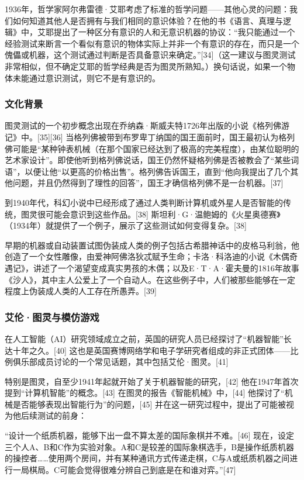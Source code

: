 1936年，哲学家阿尔弗雷德·艾耶考虑了标准的哲学问题——其他心灵的问题：我们如何知道其他人是否拥有与我们相同的意识体验？在他的书《语言、真理与逻辑》中，艾耶提出了一种区分有意识的人和无意识机器的协议：“我只能通过一个经验测试来断言一个看似有意识的物体实际上并非一个有意识的存在，而只是一个傀儡或机器，这个测试通过判断是否具备意识来确定。”[34]（这一建议与图灵测试非常相似，但不确定艾耶的哲学经典是否为图灵所熟知。）换句话说，如果一个物体未能通过意识测试，则它不是有意识的。
\subsubsection{文化背景} 
图灵测试的一个初步概念出现在乔纳森·斯威夫特1726年出版的小说《格列佛游记》中。[35][36] 当格列佛被带到布罗卑丁纳国的国王面前时，国王最初认为格列佛可能是“某种钟表机械（在那个国家已经达到了极高的完美程度），由某位聪明的艺术家设计”。即使他听到格列佛说话，国王仍然怀疑格列佛是否被教会了“某些词语”，以便让他“以更高的价格出售”。格列佛告诉国王，直到“他向我提出了几个其他问题，并且仍然得到了理性的回答”，国王才确信格列佛不是一台机器。[37]

到1940年代，科幻小说中已经形成了通过人类判断计算机或外星人是否智能的传统，图灵很可能会意识到这些作品。[38] 斯坦利·G·温鲍姆的《火星奥德赛》（1934年）就提供了一个例子，展示了这些测试如何变得复杂。[38]

早期的机器或自动装置试图伪装成人类的例子包括古希腊神话中的皮格马利翁，他创造了一个女性雕像，由爱神阿佛洛狄忒赋予生命；卡洛·科洛迪的小说《木偶奇遇记》，讲述了一个渴望变成真实男孩的木偶；以及E·T·A·霍夫曼的1816年故事《沙人》，其中主人公爱上了一个自动人。在这些例子中，人们被那些能够在一定程度上伪装成人类的人工存在所愚弄。[39]
\subsubsection{艾伦·图灵与模仿游戏} 
在人工智能（AI）研究领域成立之前，英国的研究人员已经探讨了“机器智能”长达十年之久。[40] 这也是英国赛博网络学和电子学研究者组成的非正式团体——比例俱乐部成员讨论的一个常见话题，其中包括艾伦·图灵。[41]

特别是图灵，自至少1941年起就开始了关于机器智能的研究，[42] 他在1947年首次提到“计算机智能”的概念。[43] 在图灵的报告《智能机械》中，[44] 他探讨了“机械是否能够表现出智能行为”的问题，[45] 并在这一研究过程中，提出了可能被视为他后续测试的前身：

“设计一个纸质机器，能够下出一盘不算太差的国际象棋并不难。[46] 现在，设定三个人A、B和C作为实验对象。A和C是较差的国际象棋选手，B是操作纸质机器的操控者……使用两个房间，并有某种通讯方式传递走棋，C与A或纸质机器之间进行一局棋局。C可能会觉得很难分辨自己到底是在和谁对弈。”[47]

